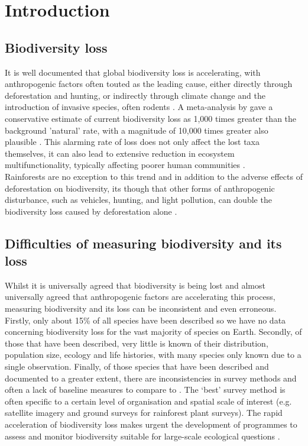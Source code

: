 
\chapter{Introduction} %

\label{Introduction}


\section{Biodiversity loss}

It is well documented that global biodiversity loss is accelerating, with anthropogenic factors often touted as the leading cause, either directly through deforestation and hunting, or indirectly through climate change and the introduction of invasive species, often rodents \citep{Chiarucci2011, Doherty2016, Newbold2015}. A meta-analysis by \cite{DeVos2015} gave a conservative estimate of current biodiversity loss as 1,000 times greater than the background 'natural' rate, with a magnitude of 10,000 times greater also plausible \citep{Ceballos2015}. This alarming rate of loss does not only affect the lost taxa themselves, it can also lead to extensive reduction in ecosystem multifunctionality, typically affecting poorer human communities \citep{Chiarucci2011, Allan2015, Fanin2018}.\\

\noindent Rainforests are no exception to this trend and in addition to the adverse effects of deforestation on biodiversity, its though that other forms of anthropogenic disturbance, such as vehicles, hunting, and light pollution, can double the biodiversity loss caused by deforestation alone \citep{Barlow2016}.

\section{Difficulties of measuring biodiversity and its loss}

Whilst it is universally agreed that biodiversity is being lost and almost universally agreed that anthropogenic factors are accelerating this process, measuring biodiversity and its loss can be inconsistent and even erroneous. Firstly, only about 15\% of all species have been described so we have no data concerning biodiversity loss for the vast majority of species on Earth. Secondly, of those that have been described, very little is known of their distribution, population size, ecology and life histories, with many species only known due to a single observation. Finally, of those species that have been described and documented to a greater extent, there are inconsistencies in survey methods and often a lack of baseline measures to compare to \citep{TheRoy2003}.  The ‘best’ survey method is often specific to a certain level of organisation and spatial scale of interest (e.g. satellite imagery and ground surveys for rainforest plant surveys). The rapid acceleration of biodiversity loss makes urgent the development of programmes to assess and monitor biodiversity suitable for large-scale ecological questions \citep{Chiarucci2011}.

